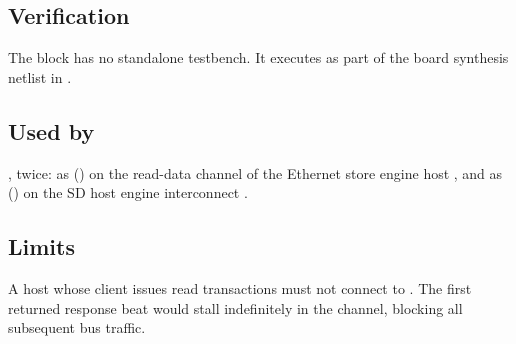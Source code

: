 \subsection*{Verification}

The block has no standalone testbench. It executes as part of the board
synthesis netlist in .

\subsection*{Used by}

, twice: as  () on the read-data channel
of the Ethernet store engine host , and as  ()
on the SD host engine interconnect .

\subsection*{Limits}

A host whose client issues read transactions must not connect to .
The first returned response beat would stall indefinitely in the channel, blocking
all subsequent bus traffic.
